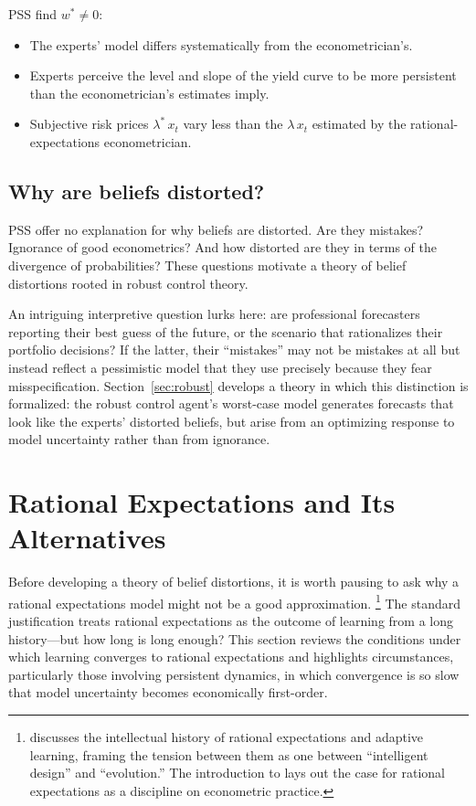 \documentclass[12pt]{article}
\theoremstyle{definition}
\begin{document}
PSS find $w^* \neq 0$:
\begin{itemize}
\item The experts' model differs systematically from the
      econometrician's.
\item Experts perceive the level and slope of the yield curve to be more
      persistent than the econometrician's estimates imply.
\item Subjective risk prices $\lambda^*\, x_t$ vary less than the
      $\lambda\, x_t$ estimated by the rational-expectations
      econometrician.
\end{itemize}

\subsection{Why are beliefs distorted?}

PSS offer no explanation for why beliefs are distorted.  Are they
mistakes?  Ignorance of good econometrics?  And how distorted are they
in terms of the divergence of probabilities?  These questions motivate a
theory of belief distortions rooted in robust control theory.

An intriguing interpretive question lurks here: are professional
forecasters reporting their best guess of the future, or the scenario
that rationalizes their portfolio decisions?  If the latter, their
``mistakes'' may not be mistakes at all but instead reflect a
pessimistic model that they use precisely because they fear
misspecification.  Section~\ref{sec:robust} develops a theory in which
this distinction is formalized: the robust control agent's worst-case
model generates forecasts that look like the experts' distorted beliefs,
but arise from an optimizing response to model uncertainty rather than
from ignorance.


\section{Rational Expectations and Its Alternatives}
\label{sec:RE-limits}

Before developing a theory of belief distortions, it is worth pausing to
ask why a rational expectations model might not be a good approximation.%
\footnote{\citet{Sargent2008} discusses the intellectual history of rational
expectations and adaptive learning, framing the tension between them as
one between ``intelligent design'' and ``evolution.''  The introduction
to \citet{LucasSargent1981} lays out the case for rational expectations
as a discipline on econometric practice.}
The standard justification treats rational expectations as the outcome
of learning from a long history---but how long is long enough?  This
section reviews the conditions under which learning converges to
rational expectations and highlights circumstances, particularly those
involving persistent dynamics, in which convergence is so slow that
model uncertainty becomes economically first-order.
\end{document}
